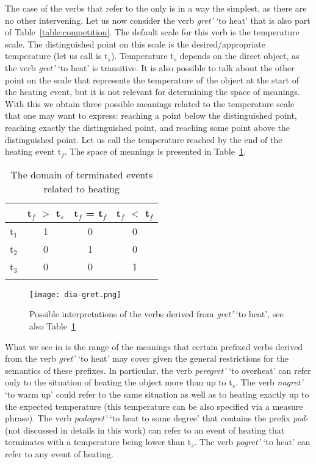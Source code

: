 The case of the verbs that refer to the  only is in a way the simplest, as there are no other  intervening. Let us now consider the verb \textit{gret'} `to heat' that is also part of Table~\ref{table:competition}. The default scale for this verb is the temperature scale. The distinguished point on this scale is the desired/appropriate temperature (let us call is t$_s$). Temperature t$_s$ depends on the direct object, as the verb \textit{gret'} `to heat' is transitive. It is also possible to talk about the other point on the scale that represents the temperature of the object at the start of the heating event, but it is not relevant for determining the space of meanings. With this we obtain three possible meanings related to the temperature scale that one may want to express: reaching a point below the distinguished point, reaching exactly the distinguished point, and reaching some point above the distinguished point. Let us call the temperature reached by the end of the heating event t$_f$. The space of meanings is presented in Table~\ref{table:gret}.

\begin{table}
\caption{The domain of terminated events related to heating \label{table:gret}}
\begin{tabular}{lccc}
\lsptoprule
 & t$_f$ $>$ t$_s$ & t$_f$ = t$_f$ & t$_f$ $<$ t$_f$\\
\midrule
t$_1$ & 1 & 0 & 0\\
t$_2$ & 0 & 1 & 0\\
t$_3$ & 0 & 0 & 1\\
\lspbottomrule
\end{tabular}
\end{table}

\begin{figure}
\centering
\texttt{[image: dia-gret.png]}
\caption{Possible interpretations of the verbs derived from \textit{gret'} `to heat', see also Table~\ref{table:gret} \label{fig:gret}}
\end{figure}

What we see in  is the range of the meanings that certain prefixed verbs derived from the verb \textit{gret'} `to heat' may cover given the general restrictions for the semantics of these prefixes. In particular, the verb \textit{peregret'} `to overheat' can refer only to the situation of heating the object more than up to t$_s$. The verb \textit{nagret'} `to warm up' could refer to the same situation as well as to heating exactly up to the expected temperature (this temperature can be also specified via a measure phrase). The verb \textit{podogret'} `to heat to some degree' that contains the prefix \textit{pod-} (not discussed in details in this work) can refer to an event of heating that terminates with a temperature being lower than t$_s$. The verb \textit{pogret'} `to heat' can refer to any event of heating.

